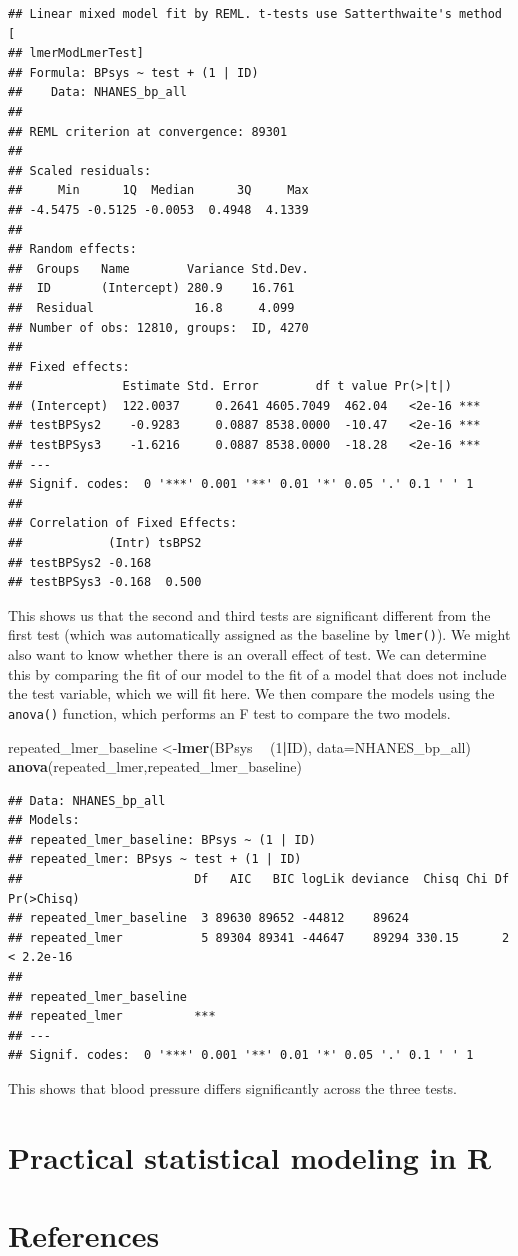 \documentclass[12pt,]{book}
\newenvironment{Shaded}{\begin{snugshade}}{\end{snugshade}}
\newcommand{\DataTypeTok}[1]{\textcolor[rgb]{0.13,0.29,0.53}{#1}}
\newcommand{\DecValTok}[1]{\textcolor[rgb]{0.00,0.00,0.81}{#1}}
\newcommand{\KeywordTok}[1]{\textcolor[rgb]{0.13,0.29,0.53}{\textbf{#1}}}
\newcommand{\NormalTok}[1]{#1}
\newcommand{\OperatorTok}[1]{\textcolor[rgb]{0.81,0.36,0.00}{\textbf{#1}}}
\newcommand{\StringTok}[1]{\textcolor[rgb]{0.31,0.60,0.02}{#1}}
\begin{document}
\begin{verbatim}
## Linear mixed model fit by REML. t-tests use Satterthwaite's method [
## lmerModLmerTest]
## Formula: BPsys ~ test + (1 | ID)
##    Data: NHANES_bp_all
## 
## REML criterion at convergence: 89301
## 
## Scaled residuals: 
##     Min      1Q  Median      3Q     Max 
## -4.5475 -0.5125 -0.0053  0.4948  4.1339 
## 
## Random effects:
##  Groups   Name        Variance Std.Dev.
##  ID       (Intercept) 280.9    16.761  
##  Residual              16.8     4.099  
## Number of obs: 12810, groups:  ID, 4270
## 
## Fixed effects:
##              Estimate Std. Error        df t value Pr(>|t|)    
## (Intercept)  122.0037     0.2641 4605.7049  462.04   <2e-16 ***
## testBPSys2    -0.9283     0.0887 8538.0000  -10.47   <2e-16 ***
## testBPSys3    -1.6216     0.0887 8538.0000  -18.28   <2e-16 ***
## ---
## Signif. codes:  0 '***' 0.001 '**' 0.01 '*' 0.05 '.' 0.1 ' ' 1
## 
## Correlation of Fixed Effects:
##            (Intr) tsBPS2
## testBPSys2 -0.168       
## testBPSys3 -0.168  0.500
\end{verbatim}

This shows us that the second and third tests are significant different from the first test (which was automatically assigned as the baseline by \texttt{lmer()}). We might also want to know whether there is an overall effect of test. We can determine this by comparing the fit of our model to the fit of a model that does not include the test variable, which we will fit here. We then compare the models using the \texttt{anova()} function, which performs an F test to compare the two models.

\begin{Shaded}
\begin{Highlighting}[]
\NormalTok{repeated_lmer_baseline <-}\KeywordTok{lmer}\NormalTok{(BPsys }\OperatorTok{~}\StringTok{ }\NormalTok{(}\DecValTok{1}\OperatorTok{|}\NormalTok{ID), }\DataTypeTok{data=}\NormalTok{NHANES_bp_all)}
\KeywordTok{anova}\NormalTok{(repeated_lmer,repeated_lmer_baseline)}
\end{Highlighting}
\end{Shaded}

\begin{verbatim}
## Data: NHANES_bp_all
## Models:
## repeated_lmer_baseline: BPsys ~ (1 | ID)
## repeated_lmer: BPsys ~ test + (1 | ID)
##                        Df   AIC   BIC logLik deviance  Chisq Chi Df Pr(>Chisq)
## repeated_lmer_baseline  3 89630 89652 -44812    89624                         
## repeated_lmer           5 89304 89341 -44647    89294 330.15      2  < 2.2e-16
##                           
## repeated_lmer_baseline    
## repeated_lmer          ***
## ---
## Signif. codes:  0 '***' 0.001 '**' 0.01 '*' 0.05 '.' 0.1 ' ' 1
\end{verbatim}

This shows that blood pressure differs significantly across the three tests.

\hypertarget{practical-statistical-modeling-in-r}{%
\chapter{Practical statistical modeling in R}\label{practical-statistical-modeling-in-r}}

\hypertarget{references}{%
\chapter{References}\label{references}}
\end{document}

